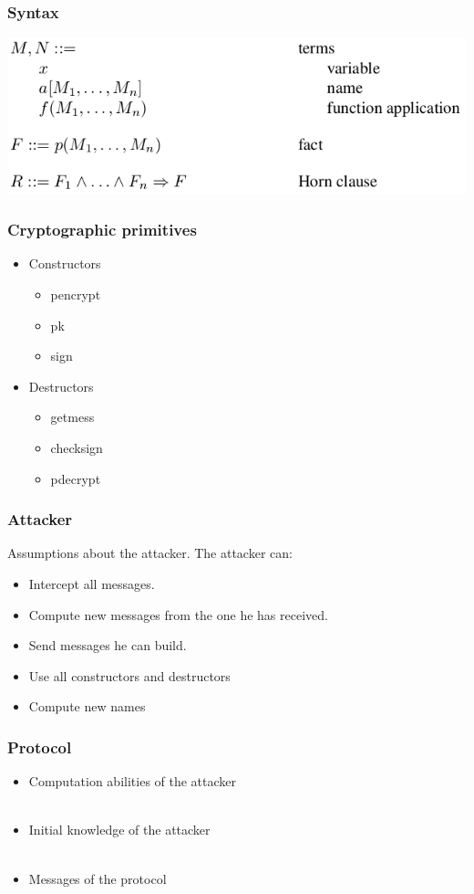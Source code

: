 \documentclass[10pt]{beamer}
\begin{document}
\begin{frame}
  \frametitle{Syntax}
  \includegraphics[width=.8\textwidth]{graphics/syntax.png}
\end{frame}


\begin{frame}
  \frametitle{Cryptographic primitives}
  \begin{itemize}
  \item Constructors
    \begin{itemize}
    \item pencrypt
    \item pk
    \item sign
    
    \end{itemize}
    
  \item Destructors
    \begin{itemize}
    \item getmess
    \item checksign
    \item pdecrypt
    \end{itemize}
  \end{itemize}
\end{frame}

\begin{frame}
  \frametitle{Attacker}
  Assumptions about the attacker. The attacker can:
  \begin{itemize}
  \item Intercept all messages.
  \item Compute new messages from the one he has received.
  \item Send messages he can build.
  \item Use all constructors and destructors
  \item Compute new names
  \end{itemize}
\end{frame}

\begin{frame}
  \frametitle{Protocol}
  \begin{itemize}
  \item Computation abilities of the attacker
    \\~\\
  \item Initial knowledge of the attacker
    \\~\\
  \item Messages of the protocol
  \end{itemize}
\end{frame}
\end{document}
